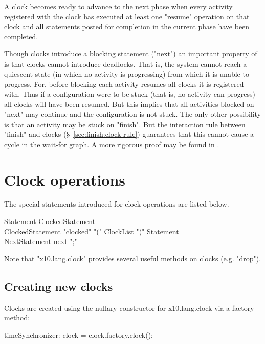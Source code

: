 A clock becomes ready to advance to the next phase when every activity
registered with the clock has executed at least one \xcd"resume"
operation on that clock and all statements posted for completion in
the current phase have been completed.

Though clocks introduce a blocking statement (\xcd"next") an important
property of \Xten{} is that clocks cannot introduce deadlocks. That
is, the system cannot reach a quiescent state (in which no activity is
progressing) from which it is unable to progress. For, before blocking
each activity resumes all clocks it is registered with. Thus if a
configuration were to be stuck (that is, no activity can progress) all
clocks will have been resumed. But this implies that all activities
blocked on \xcd"next" may continue and the configuration is not stuck.
The only other possibility is that an activity may be stuck on
\xcd"finish". But the interaction rule between \xcd"finish" and clocks
(\S~\ref{sec:finish:clock-rule}) guarantees that this cannot cause a cycle
in the wait-for graph. A more rigorous proof may be found in \cite{X10-concur05}.

\section{Clock operations}\label{sec:clock}
The special statements introduced for clock operations are listed below.
\begin{grammar}
Statement \: ClockedStatement \\
ClockedStatement \: \xcd"clocked" \xcd"(" ClockList \xcd")" Statement \\
NextStatement \: next \xcd";" \\
\end{grammar}

Note that \xcd"x10.lang.clock" provides several useful methods on
clocks (e.g. \xcd"drop").

\subsection{Creating new clocks}\label{sec:clock:create}
Clocks are created using the nullary constructor for {\cf
x10.lang.clock} via a factory method:

\begin{xten}
timeSynchronizer: clock = clock.factory.clock();
\end{xten}

